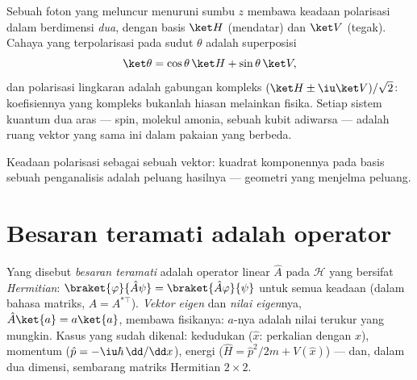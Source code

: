 \begin{example}\label{ex:b3:quantum-formalism:polarization}
Sebuah foton yang meluncur menuruni sumbu $z$ membawa keadaan polarisasi
dalam  berdimensi \emph{dua}, dengan basis $\ket H$
(mendatar) dan $\ket V$ (tegak). Cahaya yang terpolarisasi pada sudut
$\theta$ adalah superposisi
\[
\ket\theta = \cos\theta\,\ket H + \sin\theta\,\ket V ,
\]
dan polarisasi lingkaran adalah gabungan kompleks $(\ket H \pm
\iu\ket V)/\sqrt2$: koefisiennya yang kompleks bukanlah hiasan melainkan
fisika. Setiap sistem kuantum dua aras --- spin, molekul amonia, sebuah
kubit adiwarsa --- adalah ruang vektor yang sama ini dalam pakaian yang
berbeda.
\end{example}

\begin{omfigure}

{\small Keadaan polarisasi sebagai sebuah vektor: kuadrat komponennya
pada basis sebuah penganalisis adalah peluang hasilnya --- geometri yang
menjelma peluang.}
\end{omfigure}

\section{Besaran teramati adalah operator}

\begin{definition}\label{def:b3:quantum-formalism:observable}
Yang disebut \emph{besaran teramati} adalah operator linear $\hat A$
pada $\mathcal H$ yang bersifat \emph{Hermitian}:
$\braket{\varphi}{\hat A\psi} =
\braket{\hat A\varphi}{\psi}$ untuk semua keadaan (dalam bahasa
matriks, $A = A^{*\top}$). \emph{Vektor eigen} dan \emph{nilai eigen}nya,
$\hat A\ket{a} = a\ket{a}$, membawa fisikanya: $a$-nya adalah nilai
terukur yang mungkin. Kasus yang sudah dikenal: kedudukan ($\hat x$:
perkalian dengan $x$), momentum ($\hat p = -\iu\hbar\,\dd/\dd x$),
energi ($\hat H = \hat p^2/2m + V(\hat x)$) --- dan, dalam dua
dimensi, sembarang matriks Hermitian $2\times2$.
\end{definition}

